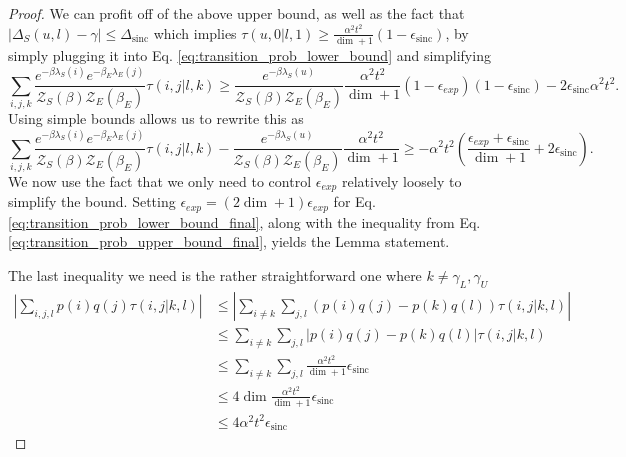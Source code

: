 \documentclass{article}
\newcommand{\parens}[1]{\left( #1 \right)}
\newcommand{\abs}[1]{\left| #1 \right|}
\newcommand{\partfun}{\mathcal{Z}}
\DeclareMathOperator{\sinc}{sinc}
\begin{document}
\begin{proof}
    We can profit off of the above upper bound, as well as the fact that $|\Delta_S(u,l) - \gamma| \leq \Delta_{\sinc}$ which implies $\tau(u,0|l,1) \geq \frac{\alpha^2 t^2}{\dim + 1} (1 - \epsilon_{\sinc})$, by simply plugging it into Eq. \eqref{eq:transition_prob_lower_bound} and simplifying
    \begin{equation}
        \sum_{i, j, k} \frac{e^{-\beta \lambda_S(i)} e^{-\beta_E \lambda_E(j)}}{\partfun_S(\beta) \partfun_E(\beta_E)} \tau(i,j|l,k) \geq \frac{e^{-\beta \lambda_S(u)}}{\partfun_S(\beta) \partfun_E(\beta_E)}\frac{\alpha^2 t^2}{\dim + 1} (1 - \epsilon_{exp})(1 - \epsilon_{\sinc}) - 2 \epsilon_{\sinc} \alpha^2 t^2.
    \end{equation}
    Using simple bounds allows us to rewrite this as
    \begin{equation}
        \sum_{i, j, k} \frac{e^{-\beta \lambda_S(i)} e^{-\beta_E \lambda_E(j)}}{\partfun_S(\beta) \partfun_E(\beta_E)} \tau(i,j|l,k) - \frac{e^{-\beta \lambda_S(u)}}{\partfun_S(\beta) \partfun_E(\beta_E)}\frac{\alpha^2 t^2}{\dim + 1} \geq - \alpha^2 t^2 \parens{\frac{\epsilon_{exp} + \epsilon_{\sinc}}{\dim + 1} + 2 \epsilon_{\sinc}}. \label{eq:transition_prob_lower_bound_final}
    \end{equation}
    We now use the fact that we only need to control $\epsilon_{exp}$ relatively loosely to simplify the bound. Setting $\epsilon_{exp} = (2 \dim + 1) \epsilon_{exp}$ for Eq. \eqref{eq:transition_prob_lower_bound_final}, along with the inequality from Eq. \eqref{eq:transition_prob_upper_bound_final}, yields the Lemma statement.

    The last inequality we need is the rather straightforward one where $k \neq \gamma_L, \gamma_U$
    \begin{align}
        \abs{\sum_{i,j,l} p(i) q(j) \tau(i,j|k,l)} &\leq \abs{\sum_{i\neq k} \sum_{j,l} (p(i)q(j) - p(k) q(l)) \tau(i,j|k,l)} \\
        &\leq \sum_{i \neq k} \sum_{j,l} \abs{p(i) q(j) - p(k) q(l)} \tau(i,j|k,l) \\
        &\leq \sum_{i \neq k} \sum_{j,l} \frac{\alpha^2 t^2}{\dim + 1} \epsilon_{\sinc} \\
        &\leq 4 \dim \frac{\alpha^2 t^2}{\dim + 1} \epsilon_{\sinc} \\
        &\leq 4 \alpha^2 t^2 \epsilon_{\sinc}
    \end{align}
\end{proof}
\end{document}
